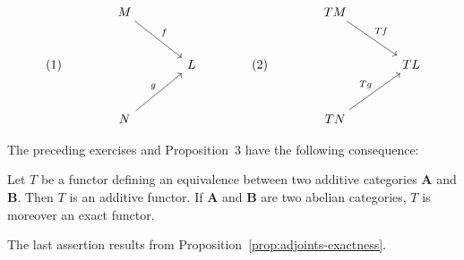 \[
\begin{tikzcd}[column sep=large, row sep=large]
    & M \arrow[rd, "f"] &     &     & TM \arrow[rd, "Tf"] & \\
(1) &                 & L & (2) &                  & TL \\
    & N \arrow[ru, "g"] &     &     & TN \arrow[ru, "Tg"] &
\end{tikzcd}
\]

The preceding exercises and Proposition~3 have the following
consequence:

\begin{proposition}\label{prop:equivalence-additive}
Let $T$ be a functor defining an equivalence between two additive
categories $\mathbf{A}$ and $\mathbf{B}$. Then $T$ is an additive
functor. If $\mathbf{A}$ and $\mathbf{B}$ are two abelian categories,
$T$ is moreover an exact functor.
\end{proposition}

The last assertion results from
Proposition~\ref{prop:adjoints-exactness}.
